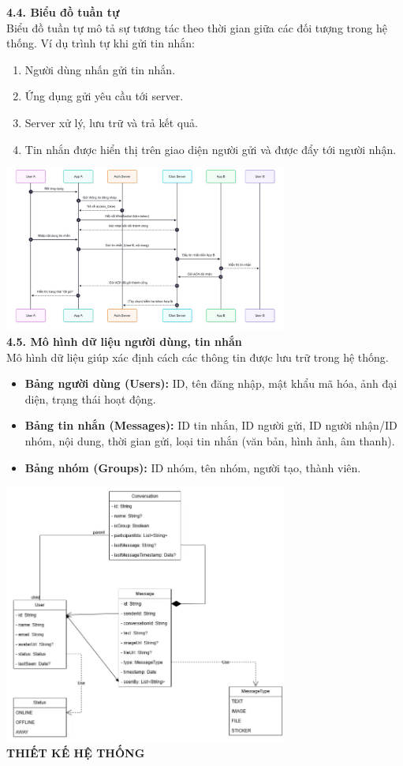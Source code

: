 \documentclass[12pt,a4paper]{article}
\begin{document}
	\textbf{4.4. Biểu đồ tuần tự} \\
	Biểu đồ tuần tự mô tả sự tương tác theo thời gian giữa các đối tượng trong hệ thống. Ví dụ trình tự khi gửi tin nhắn:
	\begin{enumerate}
		\item Người dùng nhấn gửi tin nhắn.
		\item Ứng dụng gửi yêu cầu tới server.
		\item Server xử lý, lưu trữ và trả kết quả.
		\item Tin nhắn được hiển thị trên giao diện người gửi và được đẩy tới người nhận.
	\end{enumerate}
	\includegraphics[width=0.7\textwidth]{sodotuantu.jpg}\\[0.5cm]
	
	\textbf{4.5. Mô hình dữ liệu người dùng, tin nhắn} \\
	Mô hình dữ liệu giúp xác định cách các thông tin được lưu trữ trong hệ thống.
	\begin{itemize}
		\item \textbf{Bảng người dùng (Users):} ID, tên đăng nhập, mật khẩu mã hóa, ảnh đại diện, trạng thái hoạt động.
		\item \textbf{Bảng tin nhắn (Messages):} ID tin nhắn, ID người gửi, ID người nhận/ID nhóm, nội dung, thời gian gửi, loại tin nhắn (văn bản, hình ảnh, âm thanh).
		\item \textbf{Bảng nhóm (Groups):} ID nhóm, tên nhóm, người tạo, thành viên.
	\end{itemize}
	\includegraphics[width=0.7\textwidth]{hinhsodo.png}\\[0.5cm]
	\vspace{0.5cm}
	\clearpage
	\textbf{THIẾT KẾ HỆ THỐNG} \\
	
\end{document}
